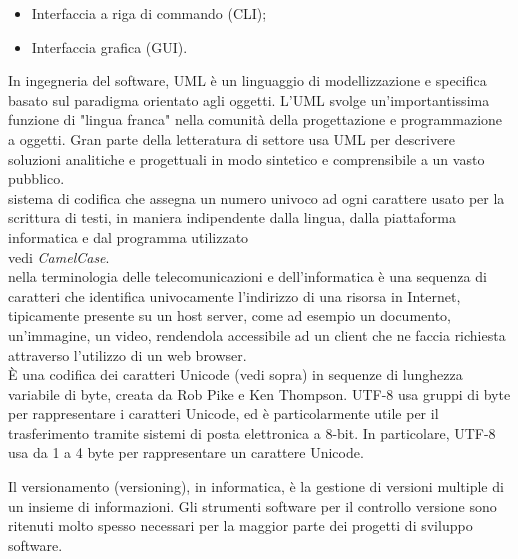 \documentclass{scalatekids-article}
\begin{document}
  \begin{itemize}
  \item Interfaccia a riga di commando (CLI);
  \item Interfaccia grafica (GUI).
  \end{itemize}

   In ingegneria del software, UML è un linguaggio di modellizzazione e specifica basato sul paradigma orientato agli oggetti.
  L'UML svolge un'importantissima funzione di "lingua franca" nella comunità della progettazione e programmazione a oggetti. Gran parte della letteratura di settore usa UML per descrivere soluzioni analitiche e progettuali in modo sintetico e comprensibile a un vasto pubblico.
  \\

    sistema di codifica che assegna un numero univoco ad ogni carattere usato per la scrittura di testi, in maniera indipendente dalla lingua, dalla piattaforma informatica e dal programma utilizzato
   \\

   vedi \textit{CamelCase}.
  \\

   nella terminologia delle telecomunicazioni e dell'informatica è una sequenza di caratteri che identifica univocamente l'indirizzo di una risorsa in Internet, tipicamente presente su un host server, come ad esempio un documento, un'immagine, un video, rendendola accessibile ad un client che ne faccia richiesta attraverso l'utilizzo di un web browser.
  \\

   È una codifica dei caratteri Unicode (vedi sopra) in sequenze di lunghezza variabile di byte, creata da Rob Pike e Ken Thompson. UTF-8 usa gruppi di byte per rappresentare i caratteri Unicode, ed è particolarmente utile per il trasferimento tramite sistemi di posta elettronica a 8-bit.
  In particolare, UTF-8 usa da 1 a 4 byte per rappresentare un carattere Unicode.
  \\


   Il versionamento (versioning), in informatica, è la gestione di versioni multiple di un insieme di informazioni.
  Gli strumenti software per il controllo versione sono ritenuti molto spesso necessari per la maggior parte dei progetti di sviluppo software.
  \\
\end{document}
